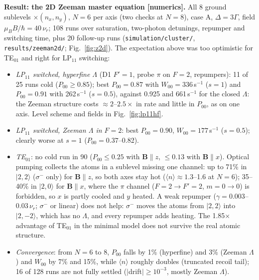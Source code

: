 \documentclass[11pt,a4paper]{article}
\newcommand{\ket}[1]{|#1\rangle}
\begin{document}
\textbf{Result: the 2D Zeeman master equation [numerics].} All 8 ground sublevels $\times(n_x,n_y)$, $N=6$ per axis (two checks at $N=8$), case A, $\Delta=3\Gamma$, field $\mu_BB/\hbar=40\,\nu_r$; 108 runs over saturation, two-photon detunings, repumper and switching time, plus 20 follow-up runs (\texttt{simulation/cluster/}, \texttt{results/zeeman2d/}; Fig.~\ref{fig:z2d}). The expectation above was too optimistic for TE$_{01}$ and right for LP$_{11}$ switching:
\begin{itemize}
\item \emph{LP$_{11}$ switched, hyperfine $\Lambda$} (D1 $F'=1$, probe $\pi$ on $F=2$, repumpers): 11 of 25 runs cold ($P_{00}\ge0.85$); best $P_{00}=0.87$ with $W_{00}=336$\,s$^{-1}$ ($s=1$) and $P_{00}=0.91$ with 262\,s$^{-1}$ ($s=0.5$), against 0.925 and 661\,s$^{-1}$ for the closed $\Lambda$: the Zeeman structure costs $\approx2$--$2.5\times$ in rate and little in $P_{00}$, as on one axis. Level scheme and fields in Fig.~\ref{fig:lp11hf}.
\item \emph{LP$_{11}$ switched, Zeeman $\Lambda$ in $F=2$}: best $P_{00}=0.90$, $W_{00}=177$\,s$^{-1}$ ($s=0.5$); clearly worse at $s=1$ ($P_{00}=0.37$--0.82).
\item \emph{TE$_{01}$}: no cold run in 90 ($P_{00}\le0.25$ with $\bm B\parallel z$, $\le0.13$ with $\bm B\parallel x$). Optical pumping collects the atoms in a sublevel missing one channel: up to 71\% in $\ket{2,2}$ ($\sigma^-$ only) for $\bm B\parallel z$, so both axes stay hot ($\langle n\rangle\approx1.3$--1.6 at $N=6$); 35--40\% in $\ket{2,0}$ for $\bm B\parallel x$, where the $\pi$ channel ($F=2\to F'=2$, $m=0\to0$) is forbidden, so $x$ is partly cooled and $y$ heated. A weak repumper ($\gamma=0.003$--0.03\,$\nu_r$; $\sigma^-$ or linear) does not help: $\sigma^-$ moves the atoms from $\ket{2,2}$ into $\ket{2,-2}$, which has no $\Lambda$, and every repumper adds heating. The 1.85$\times$ advantage of TE$_{01}$ in the minimal model does not survive the real atomic structure.
\item \emph{Convergence}: from $N=6$ to 8, $P_{00}$ falls by 1\% (hyperfine) and 3\% (Zeeman $\Lambda$) and $W_{00}$ by 7\% and 15\%, while $\langle n\rangle$ roughly doubles (truncated recoil tail); 16 of 128 runs are not fully settled ($|$drift$|\ge10^{-3}$, mostly Zeeman $\Lambda$).
\end{itemize}
\end{document}
